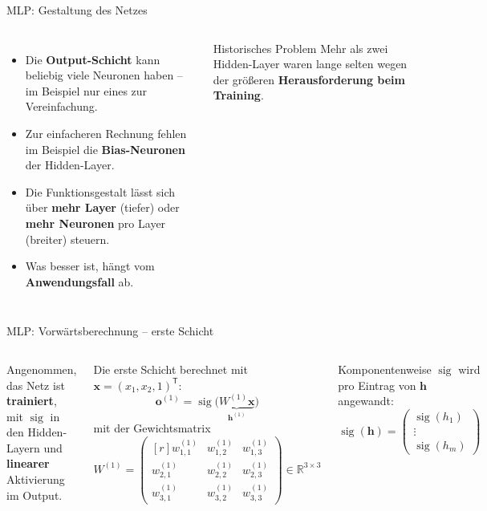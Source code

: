 \begin{frame}{MLP: Gestaltung des Netzes}
\begin{columns}
\begin{itemize}
  \item Die \textbf{Output-Schicht} kann beliebig viele Neuronen haben --
        im Beispiel nur eines zur Vereinfachung.
  \item Zur einfacheren Rechnung fehlen im Beispiel die \textbf{Bias-Neuronen}
        der Hidden-Layer.
  \item Die Funktionsgestalt lässt sich über \textbf{mehr Layer}
        (tiefer) oder \textbf{mehr Neuronen} pro Layer (breiter) steuern.
  \item Was besser ist, hängt vom \textbf{Anwendungsfall} ab.
\end{itemize}

\begin{block}{Historisches Problem}
Mehr als zwei Hidden-Layer waren lange selten wegen der größeren
\textbf{Herausforderung beim Training}.
\end{block}
\end{columns}
\end{frame}


\begin{frame}{MLP: Vorwärtsberechnung -- erste Schicht}
\begin{columns}
Angenommen, das Netz ist \textbf{trainiert}, mit $\operatorname{sig}$ in den
Hidden-Layern und \textbf{linearer} Aktivierung im Output.

\vspace{0.4em}
Die erste Schicht berechnet mit $\mathbf{x} = (x_1, x_2, 1)^{\mathsf{T}}$:
\[
  \mathbf{o}^{(1)} = \operatorname{sig}\bigl(\underbrace{W^{(1)}\mathbf{x}}_{\mathbf{h}^{(1)}}\bigr)
\]
mit der Gewichtsmatrix
\[
  W^{(1)} =
  \begin{pmatrix*}[r]
    w^{(1)}_{1,1} & w^{(1)}_{1,2} & w^{(1)}_{1,3}\\
    w^{(1)}_{2,1} & w^{(1)}_{2,2} & w^{(1)}_{2,3}\\
    w^{(1)}_{3,1} & w^{(1)}_{3,2} & w^{(1)}_{3,3}
  \end{pmatrix*} \in \mathbb{R}^{3\times 3}
\]

\begin{blockC2}{Komponentenweise}
$\operatorname{sig}$ wird pro Eintrag von $\mathbf{h}$ angewandt:
\[
  \operatorname{sig}(\mathbf{h}) =
  \begin{pmatrix} \operatorname{sig}(h_1)\\ \vdots\\ \operatorname{sig}(h_m) \end{pmatrix}
\]
\end{blockC2}
\end{columns}
\end{frame}


